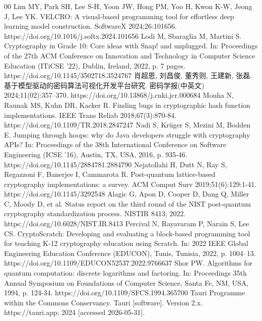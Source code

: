 \documentclass[preprint,12pt,a4paper]{elsarticle}
\begin{document}
\begin{thebibliography}{00}
	Lim MY, Park SH, Lee S-H, Yoon JW, Hong PM, Yoo H, Kwon K-W, Jeong J, Lee YK. VELCRO: A visual-based programming tool for effortless deep learning model construction. SoftwareX 2024;26:101656. https://doi.org/10.1016/j.softx.2024.101656
	Lodi M, Sbaraglia M, Martini S. Cryptography in Grade 10: Core ideas with Snap! and unplugged. In: Proceedings of the 27th ACM Conference on Innovation and Technology in Computer Science Education (ITiCSE '22), Dublin, Ireland, 2022, p. 7 pages. https://doi.org/10.1145/3502718.3524767
	肖超恩, 刘昌俊, 董秀则, 王建新, 张磊. 基于模型驱动的密码算法可视化开发平台研究. 密码学报(中英文) 2024;11(02):357--370. https://doi.org/10.13868/j.cnki.jcr.000684
	Mouha N, Raunak MS, Kuhn DR, Kacker R. Finding bugs in cryptographic hash function implementations. IEEE Trans Reliab 2018;67(3):870-84. https://doi.org/10.1109/TR.2018.2847247
	Nadi S, Kr\"uger S, Mezini M, Bodden E. Jumping through hoops: why do Java developers struggle with cryptography APIs? In: Proceedings of the 38th International Conference on Software Engineering (ICSE '16), Austin, TX, USA, 2016, p. 935-46. https://doi.org/10.1145/2884781.2884790
	Nejatollahi H, Dutt N, Ray S, Regazzoni F, Banerjee I, Cammarota R. Post-quantum lattice-based cryptography implementations: a survey. ACM Comput Surv 2019;51(6):129:1-41. https://doi.org/10.1145/3292548
	Alagic G, Apon D, Cooper D, Dang Q, Miller C, Moody D, et al. Status report on the third round of the NIST post-quantum cryptography standardization process. NISTIR 8413; 2022. https://doi.org/10.6028/NIST.IR.8413
	Percival N, Rayavaram P, Narain S, Lee CS. CryptoScratch: Developing and evaluating a block-based programming tool for teaching K-12 cryptography education using Scratch. In: 2022 IEEE Global Engineering Education Conference (EDUCON), Tunis, Tunisia, 2022, p. 1004--13. https://doi.org/10.1109/EDUCON52537.2022.9766637
	Shor PW. Algorithms for quantum computation: discrete logarithms and factoring. In: Proceedings 35th Annual Symposium on Foundations of Computer Science, Santa Fe, NM, USA, 1994, p. 124-34. https://doi.org/10.1109/SFCS.1994.365700
	Tauri Programme within the Commons Conservancy. Tauri [software]. Version 2.x. https://tauri.app; 2024 [accessed 2026-05-31].

\end{thebibliography}
\end{document}
